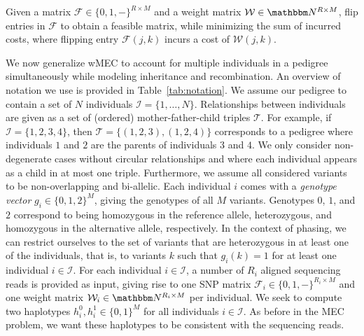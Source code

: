 \begin{problem}[wMEC]
Given a matrix $\mathcal{F}\in\{0,1,-\}^{R\times M}$ and a weight matrix $\mathcal{W}\in\N^{R\times M}$, flip entries in $\mathcal{F}$ to obtain a feasible matrix, while minimizing the sum of incurred costs, where flipping entry $\mathcal{F}(j,k)$ incurs a cost of $\mathcal{W}(j,k)$.
\end{problem}

We now generalize wMEC to account for multiple individuals in a pedigree simultaneously while modeling inheritance and recombination.
An overview of notation we use is provided in Table~\ref{tab:notation}.
We assume our pedigree to contain a set of $N$ individuals $\mathcal{I}=\{1,\ldots,N\}$.
Relationships between individuals are given as a set of (ordered) mother-father-child triples $\mathcal{T}$.
For example, if $\mathcal{I}=\{1,2,3,4\}$, then $\mathcal{T}=\big\{(1,2,3),(1,2,4)\big\}$ corresponds to a pedigree where individuals $1$ and $2$ are the parents of individuals $3$ and $4$.
We only consider non-degenerate cases without circular relationships and where each individual appears as a child in at most one triple.
Furthermore, we assume all considered variants to be non-overlapping and bi-allelic.
Each individual $i$ comes with a \emph{genotype vector} $g_i\in\{0,1,2\}^M$, giving the genotypes of all $M$ variants.
Genotypes $0$, $1$, and $2$ correspond to being homozygous in the reference allele, heterozygous, and homozygous in the alternative allele, respectively.
In the context of phasing, we can restrict ourselves to the set of variants that are heterozygous in at least one of the individuals, that is, to variants $k$ such that $g_i(k)=1$ for at least one individual $i\in\mathcal{I}$.
For each individual $i\in \mathcal{I}$, a number of $R_i$ aligned sequencing reads is provided as input, giving rise to one SNP matrix $\mathcal{F}_i\in\{0,1,-\}^{R_i\times M}$ and one weight matrix $\mathcal{W}_i\in\N^{R_i\times M}$ per individual.
We seek to compute two haplotypes $h^0_i,h^1_i\in\{0,1\}^M$ for all individuals $i\in\mathcal{I}$.
As before in the MEC problem, we want these haplotypes to be consistent with the sequencing reads.

